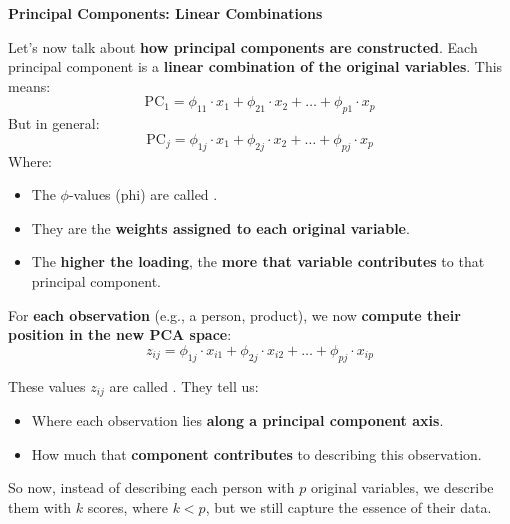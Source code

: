 \highspace
\begin{flushleft}
    \textcolor{Green3}{ \textbf{Principal Components: Linear Combinations}}
\end{flushleft}
Let's now talk about \textbf{how principal components are constructed}. Each principal component is a \textbf{linear combination of the original variables}. This means:
\begin{equation*}
    \text{PC}_{1} = \phi_{11} \cdot x_{1} + \phi_{21} \cdot x_{2} + \dots + \phi_{p1} \cdot x_{p}
\end{equation*}
But in general:
\begin{equation}
    \text{PC}_{j} = \phi_{1j} \cdot x_{1} + \phi_{2j} \cdot x_{2} + \dots + \phi_{pj} \cdot x_{p}
\end{equation}
Where:
\begin{itemize}
    \item The $\phi$-values (phi) are called .
    \item They are the \textbf{weights assigned to each original variable}.
    \item The \textbf{higher the loading}, the \textbf{more that variable contributes} to that principal component.
\end{itemize}
For \textbf{each observation} (e.g., a person, product), we now \textbf{compute their position in the new PCA space}:
\begin{equation}
    z_{ij} = \phi_{1j} \cdot x_{i1} + \phi_{2j} \cdot x_{i2} + \dots + \phi_{pj} \cdot x_{ip}
\end{equation}

\newpage

\noindent
These values $ z_{ij} $ are called . They tell us:
\begin{itemize}
    \item Where each observation lies \textbf{along a principal component axis}.
    \item How much that \textbf{component contributes} to describing this observation.
\end{itemize}
So now, instead of describing each person with $p$ original variables, we describe them with $k$ scores, where $k < p$, but we still capture the essence of their data.
